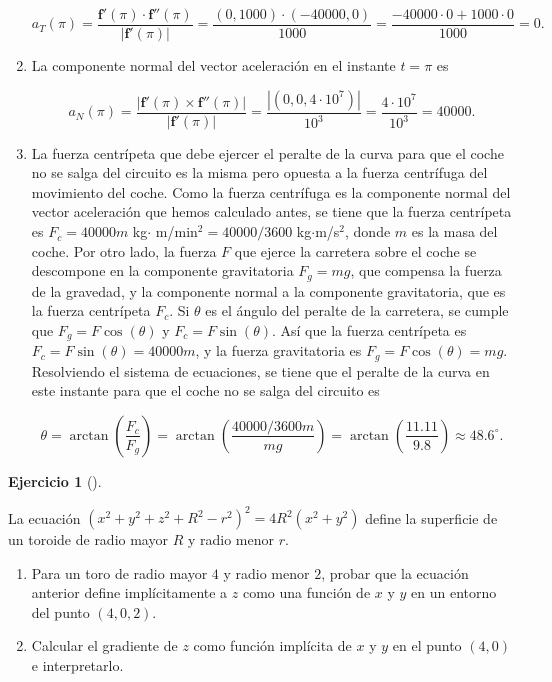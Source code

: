 \documentclass[
  spanish,
  a4paper,
]{scrreport}
\theoremstyle{definition}
\newtheorem{exercise}{Ejercicio}[chapter]
\theoremstyle{remark}
\begin{document}
\begin{tcolorbox}
\begin{enumerate}
  \[
  a_T(\pi) = \frac{\mathbf{f}'(\pi)\cdot \mathbf{f}''(\pi)}{|\mathbf{f}'(\pi)|} = \frac{(0,1000)\cdot (-40000,0)}{1000} = \frac{-40000\cdot 0 + 1000\cdot 0}{1000} = 0.
  \]
\item
  La componente normal del vector aceleración en el instante \(t=\pi\)
  es

  \[
  a_N(\pi) = \frac{|\mathbf{f}'(\pi)\times \mathbf{f}''(\pi)|}{|\mathbf{f}'(\pi)|} = \frac{|(0,0,4\cdot 10^7)|}{10^3} = \frac{4\cdot 10^7}{10^3} = 40000.
  \]
\item
  La fuerza centrípeta que debe ejercer el peralte de la curva para que
  el coche no se salga del circuito es la misma pero opuesta a la fuerza
  centrífuga del movimiento del coche. Como la fuerza centrífuga es la
  componente normal del vector aceleración que hemos calculado antes, se
  tiene que la fuerza centrípeta es \(F_c = 40000m\) kg\(\cdot\)
  m/min\(^2 = 40000/3600\) kg\(\cdot\)m/s\(^2\), donde \(m\) es la masa
  del coche. Por otro lado, la fuerza \(F\) que ejerce la carretera
  sobre el coche se descompone en la componente gravitatoria \(F_g=mg\),
  que compensa la fuerza de la gravedad, y la componente normal a la
  componente gravitatoria, que es la fuerza centrípeta \(F_c\). Si
  \(\theta\) es el ángulo del peralte de la carretera, se cumple que
  \(F_g = F\cos(\theta)\) y \(F_c = F\sin(\theta)\). Así que la fuerza
  centrípeta es \(F_c = F\sin(\theta) = 40000m\), y la fuerza
  gravitatoria es \(F_g = F\cos(\theta) = mg\). Resolviendo el sistema
  de ecuaciones, se tiene que el peralte de la curva en este instante
  para que el coche no se salga del circuito es

  \[
  \theta 
  = \arctan\left(\frac{F_c}{F_g}\right) 
  = \arctan\left(\frac{40000/3600m}{mg}\right) 
  = \arctan\left(\frac{11.11}{9.8}\right)
  \approx 48.6^\circ.
  \]
\end{enumerate}

\end{tcolorbox}

\begin{exercise}[]\protect\hypertarget{exr-3}{}\label{exr-3}

La ecuación \((x^2+y^2+z^2+R^2-r^2)^2 = 4R^2(x^2+y^2)\) define la
superficie de un toroide de radio mayor \(R\) y radio menor \(r\).

\begin{enumerate}
\def\labelenumi{\alph{enumi}.}
\item
  Para un toro de radio mayor \(4\) y radio menor \(2\), probar que la
  ecuación anterior define implícitamente a \(z\) como una función de
  \(x\) y \(y\) en un entorno del punto \((4,0,2)\).
\item
  Calcular el gradiente de \(z\) como función implícita de \(x\) y \(y\)
  en el punto \((4,0)\) e interpretarlo.
\end{enumerate}

\end{exercise}
\end{document}
